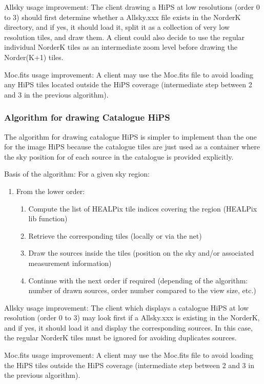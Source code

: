 \documentclass[11pt,a4paper]{ivoa}
\begin{document}
Allsky usage improvement: The client drawing a HiPS at low resolutions (order 0 to 3) should first determine whether a Allsky.xxx file exists in the NorderK directory, and if yes, it should load it, split it as a collection of very low resolution tiles, and draw them. A client could also decide to use the regular individual NorderK tiles as an intermediate zoom level before drawing the Norder(K+1) tiles.

Moc.fits usage improvement: A client may use the Moc.fits file to avoid loading any HiPS tiles located outside the HiPS coverage (intermediate step between 2 and 3 in the previous algorithm).

\subsubsection{Algorithm for drawing Catalogue HiPS}

The algorithm for drawing catalogue HiPS is simpler to implement than the one for the image HiPS because the catalogue tiles are just used as a container where the sky position for of each source in the catalogue is provided explicitly.

Basis of the algorithm: For a given sky region:

\begin{enumerate}
\item From the lower order:
\begin{enumerate}
\item Compute the list of HEALPix tile indices covering the region (HEALPix lib function)
\item Retrieve the corresponding tiles (locally or via the net)
\item Draw the sources inside the tiles (position on the sky and/or associated measurement information)
\item Continue with the next order if required (depending of the algorithm: number of drawn sources, order number compared to the view size, etc.)
\end{enumerate}
\end{enumerate}

Allsky usage improvement: The client which displays a catalogue HiPS at low resolution (order 0 to 3) may look first if a Allsky.xxx is existing in the NorderK, and if yes, it should load it and display the corresponding sources. In this case, the regular NorderK tiles must be ignored for avoiding duplicates sources. 

Moc.fits usage improvement: A client may use the Moc.fits file to avoid loading the HiPS tiles outside the HiPS coverage (intermediate step between 2 and 3 in the previous algorithm).
\end{document}
